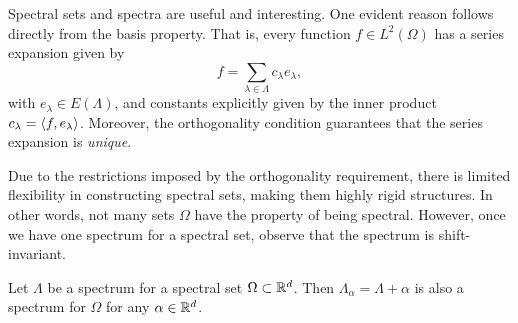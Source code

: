 \documentclass[../thesis.tex]{subfiles}
\begin{document}
Spectral sets and spectra are useful and interesting. One evident reason follows directly from the basis property. That is, every function $f \in L^2(\Omega)$ has a series expansion given by
\begin{equation}
    f = \sum_{\lambda \in \Lambda} c_{\lambda} e_{\lambda},
\end{equation}
with $e_\lambda \in E(\Lambda)$, and constants explicitly given by the inner product $c_{\lambda}=\langle f,e_{\lambda}\rangle$. Moreover, the orthogonality condition guarantees that the series expansion is \emph{unique}.

Due to the restrictions imposed by the orthogonality requirement, there is limited flexibility in constructing spectral sets, making them highly rigid structures. In other words, not many sets $\Omega$ have the property of being spectral. However, once we have one spectrum for a spectral set, observe that the spectrum is shift-invariant.
\begin{lemma}\label{lem:spectrum_shift_is_spectrum}
    Let $\Lambda$ be a spectrum for a spectral set $\Omega \subset \mathbb{R}^d$. Then $\Lambda_\alpha = \Lambda + \alpha$ is also a spectrum for $\Omega$ for any $\alpha \in \mathbb{R}^d$.
\end{lemma}
\end{document}
